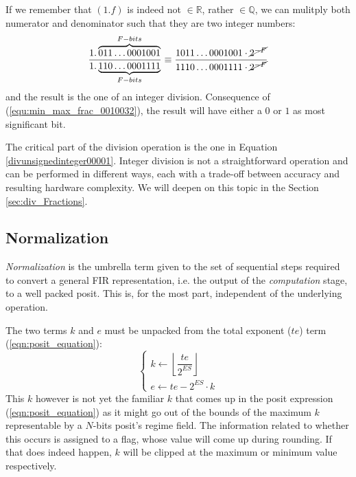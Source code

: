 If we remember that $(1.f)$ is indeed not $\in \mathbb{R}$, rather $\in \mathbb{Q}$, we can mulitply both numerator and denominator such that they are two integer numbers:
\begin{equation}\label{divunsignedinteger00001}
\frac{1.\overbrace{011\dots0001001}^{F-bits}}{1.\underbrace{110\dots0001111}_{F-bits}} \equiv \frac{1011\dots0001001 \cdot \cancel{2^{-F}}}{1110\dots0001111 \cdot \cancel{2^{-F}}}
\end{equation}
and the result is the one of an integer division. Consequence of (\ref{equ:min_max_frac_0010032}), the result will have either a $0$ or $1$ as most significant bit. 

The critical part of the division operation is the one in Equation \eqref{divunsignedinteger00001}. Integer division is not a straightforward operation and can be performed in different ways, each with a trade-off between accuracy and resulting hardware complexity. We will deepen on this topic in the Section \ref{sec:div_Fractions}. 




\subsection{Normalization}


\textit{Normalization} is the umbrella term given to the set of sequential steps required to convert a general FIR representation, i.e. the output of the \textit{computation} stage, to a well packed posit. This is, for the most part, independent of the underlying operation.


The two terms $k$ and $e$ must be unpacked from the total exponent ($te$) term (\ref{eqn:posit_equation}):
\begin{equation}\label{k_and_exp_from_totalexp}
\begin{cases}
    k \leftarrow \left \lfloor \dfrac{te}{2^{ES}} \right \rfloor \\
    e \leftarrow te - 2^{ES} \cdot k
\end{cases}
\end{equation}
This $k$ however is not yet the familiar $k$ that comes up in the posit expression (\ref{eqn:posit_equation}) as it might go out of the bounds of the maximum $k$ representable by a $N$-bits posit's regime field. The information related to whether this occurs is assigned to a flag, whose value will come up during rounding. If that does indeed happen, $k$ will be clipped at the maximum or minimum value respectively.

